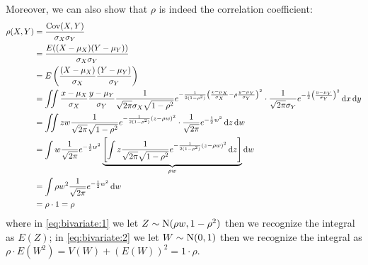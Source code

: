 \documentclass[12pt]{extarticle}
\newcommand{\cov}{{\operatorfont Cov}}
\newcommand{\Normal}{{\operatorfont N}}
\begin{document}
Moreover, we can also show that $\rho$ is indeed the correlation coefficient:
\begin{align}
    \rho(X, Y) & = \frac{\cov(X, Y)}{\sigma_X \sigma_Y}                                                                                                                                                                                                                                                                                             \\
               & = \frac{E((X - \mu_X)(Y-\mu_Y))}{\sigma_X \sigma_Y}                                                                                                                                                                                                                                                                                \\
               & = E\left(\frac{(X - \mu_X)}{\sigma_X}\frac{(Y-\mu_Y)}{\sigma_Y}\right)                                                                                                                                                                                                                                                             \\
               & = \iint \frac{x - \mu_X}{\sigma_X} \frac{y - \mu_Y}{\sigma_Y} \frac{1}{\sqrt{2 \pi} \sigma_X \sqrt{1- \rho^2}} e^{-\frac{1}{2(1-\rho^2)} \left( \frac{x - \mu_X}{\sigma_X} - \rho \frac{y-\mu_Y}{\sigma_Y} \right)^2} \cdot \frac{1}{\sqrt{2 \pi} \sigma_Y} e^{-\frac{1}{2} \left(\frac{y-\mu_Y}{\sigma_Y}\right)^2} \dd{x} \dd{y} \\
               & = \iint z w\frac{1}{\sqrt{2 \pi} \sqrt{1- \rho^2}} e^{-\frac{1}{2(1-\rho^2)} \left( z - \rho w \right)^2} \cdot \frac{1}{\sqrt{2 \pi}} e^{-\frac{1}{2} w^2} \dd{z} \dd{w}                                                                                                                                                          \\
               & = \int w \frac{1}{\sqrt{2 \pi}}e^{-\frac{1}{2} w^2} \underbrace{\left[ \int z \frac{1}{\sqrt{2 \pi} \sqrt{1- \rho^2}} e^{-\frac{1}{2(1-\rho^2)} \left( z - \rho w \right)^2} \dd{z} \right]}_{\rho w} \dd{w} \label{eq:bivariate:1}                                                                                                \\
               & = \int \rho w^2 \frac{1}{\sqrt{2 \pi}}e^{-\frac{1}{2} w^2} \dd{w}                                                                                                                                                                                                                                                                  \\
               & = \rho \cdot 1 = \rho \label{eq:bivariate:2}
\end{align}
where in \autoref{eq:bivariate:1} we let $Z \sim \Normal(\rho w, 1-\rho^2)$ then we recognize the integral as $E(Z)$;
in \autoref{eq:bivariate:2} we let $W \sim \Normal(0,1)$ then we recognize the integral as $\rho \cdot E(W^2) = V(W) + \left(E(W)\right)^2 = 1 \cdot \rho$.
\end{document}
